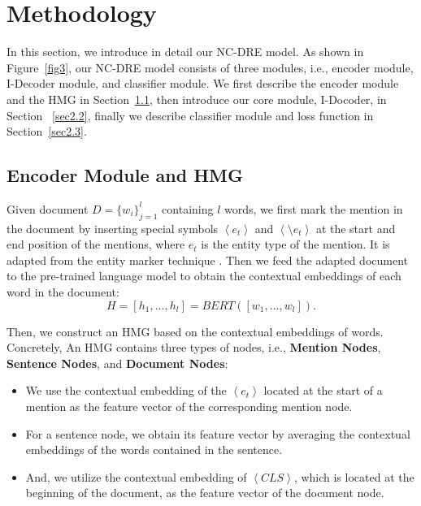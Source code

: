 \documentclass[sigconf,natbib=true]{acmart}
\begin{document}
\section{Methodology}
In this section, we introduce in detail our NC-DRE model. 
As shown in Figure~\ref{fig3}, our NC-DRE model consists of three modules, i.e.,  encoder module, I-Decoder module, and classifier module.
We first describe the encoder module and the HMG in Section~\ref{sec2.1}, then introduce our core module, I-Docoder, in Section ~\ref{sec2.2}, finally we describe classifier module and loss function in Section~\ref{sec2.3}.


\subsection{Encoder Module and HMG}
\label{sec2.1}
Given document $D=\{w_i\}_{j=1}^{l}$ containing $l$ words, we first mark the mention in the document by inserting special symbols $\left \langle e_{t} \right \rangle$ and $\left \langle \setminus e_{t} \right \rangle$ at the start and end position of the mentions, where $e_{t}$ is the entity type of the mention. 
It is adapted from the entity marker technique \cite{c:106,c:116,c:152}.
Then we feed the adapted document to the pre-trained language model to obtain the contextual embeddings of each word in the document:
\begin{equation}
H=[h_1,...,h_l] = BERT([w_1,...,w_l]) .
\end{equation}


Then, we construct an HMG based on the contextual embeddings of words.
Concretely, An HMG contains three types of nodes, i.e.,  \textbf{Mention Nodes}, \textbf{Sentence Nodes}, and \textbf{Document Nodes}:

\begin{itemize}
\item We use the contextual embedding of the $\left \langle e_{t} \right \rangle$ located at the start of a mention as the feature vector of the corresponding mention node.
\item For a sentence node, we obtain its feature vector by averaging the contextual embeddings of the words contained in the sentence. 
\item And, we utilize the contextual embedding of $\left \langle CLS \right \rangle$, which is located at the beginning of the document, as the feature vector of the document node.
\end{itemize}
\end{document}

